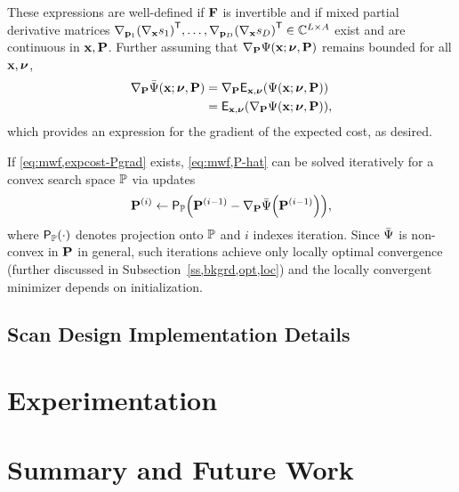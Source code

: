 These expressions are well-defined 
if $\mathbf{F}$ is invertible 
and if mixed partial derivative matrices
$\grada{\bmp_1}{\paren{\grada{\bmx}{s_1}}\tpose},
\dots,
\grada{\bmp_D}{\paren{\grada{\bmx}{s_D}}\tpose}
\in \complexes{L \times A}$
exist and are continuous in $\mathbf{x},\mathbf{P}$. 
Further assuming 
that $\grada{\bmP}{\costa{\bmx; \bmnu, \bmP}}$ remains bounded 
for all $\mathbf{x},\boldsymbol{\nu}$, 
\begin{align}
	\grada{\bmP}{\expcost\paren{\bmx; \bmnu, \bmP}} 
		&= 
		\grada{\bmP}{\expect{\bmx,\bmnu}{\costa{\bmx; \bmnu, \bmP}}}
		\nonumber \\
		&= 
		\expect{\bmx,\bmnu}{\grada{\bmP}{\costa{\bmx; \bmnu, \bmP}}},
		\label{eq:mwf,expcost-Pgrad}
\end{align} 
which provides an expression
for the gradient of the expected cost,
as desired.

If \eqref{eq:mwf,expcost-Pgrad} exists,
\eqref{eq:mwf,P-hat} can be solved iteratively
for a convex search space $\mathbb{P}$
via updates
\begin{align}
	\iter{\bmP}{i} \gets 
		\proja{\setP}{\iter{\bmP}{i-1}-\grada{\bmP}{\expcost\paren{\iter{\bmP}{i-1}}}},
		\label{eq:mwf,P-iter}
\end{align}
where $\proja{\setP}{\cdot}$ denotes projection onto $\mathbb{P}$
and $i$ indexes iteration.
Since $\bar{\Psi}$ is non-convex in $\mathbf{P}$ in general,
such iterations achieve
only locally optimal convergence
(further discussed in Subsection~\ref{ss,bkgrd,opt,loc})
and the locally convergent minimizer
depends on initialization.

\subsection{Scan Design Implementation Details}
\label{ss,mwf,acq,detail}


\section{Experimentation}
\label{s,mwf,exp}


\section{Summary and Future Work}
\label{s,mwf,summ}

